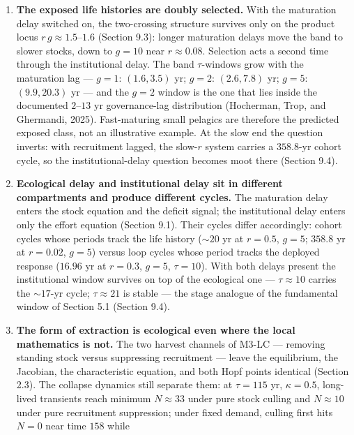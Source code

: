 \documentclass[11pt]{article}
\begin{document}
\begin{enumerate}
\def\labelenumi{(\roman{enumi})}
\item
  \textbf{The exposed life histories are doubly selected.} With the
  maturation delay switched on, the two-crossing structure survives only
  on the product locus \(r\,g \approx 1.5\)--\(1.6\) (Section 9.3):
  longer maturation delays move the band to slower stocks, down to
  \(g=10\) near \(r\approx0.08\). Selection acts a second time through
  the institutional delay. The band \(\tau\)-windows grow with the
  maturation lag --- \(g=1\): \((1.6,3.5)\) yr; \(g=2\): \((2.6,7.8)\)
  yr; \(g=5\): \((9.9,20.3)\) yr --- and the \(g=2\) window is the one
  that lies inside the documented \(2\)--\(13\) yr governance-lag
  distribution (Hocherman, Trop, and Ghermandi, 2025). Fast-maturing
  small pelagics are therefore the predicted exposed class, not an
  illustrative example. At the slow end the question inverts: with
  recruitment lagged, the slow-\(r\) system carries a \(358.8\)-yr
  cohort cycle, so the institutional-delay question becomes moot there
  (Section 9.4).
\item
  \textbf{Ecological delay and institutional delay sit in different
  compartments and produce different cycles.} The maturation delay
  enters the stock equation and the deficit signal; the institutional
  delay enters only the effort equation (Section 9.1). Their cycles
  differ accordingly: cohort cycles whose periods track the life history
  (\(\sim 20\) yr at \(r = 0.5\), \(g = 5\); \(358.8\) yr at
  \(r = 0.02\), \(g = 5\)) versus loop cycles whose period tracks the
  deployed response (\(16.96\) yr at \(r = 0.3\), \(g = 5\),
  \(\tau = 10\)). With both delays present the institutional window
  survives on top of the ecological one --- \(\tau \approx 10\) carries
  the \(\sim 17\)-yr cycle; \(\tau \approx 21\) is stable --- the stage
  analogue of the fundamental window of Section 5.1 (Section 9.4).
\item
  \textbf{The form of extraction is ecological even where the local
  mathematics is not.} The two harvest channels of M3-LC --- removing
  standing stock versus suppressing recruitment --- leave the
  equilibrium, the Jacobian, the characteristic equation, and both Hopf
  points identical (Section 2.3). The collapse dynamics still separate
  them: at \(\tau = 115\) yr, \(\kappa = 0.5\), long-lived transients
  reach minimum \(N \approx 33\) under pure stock culling and
  \(N \approx 10\) under pure recruitment suppression; under fixed
  demand, culling first hits \(N = 0\) near time \(158\) while

\end{enumerate}
\end{document}
